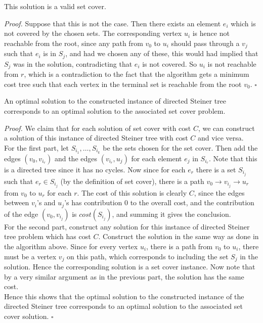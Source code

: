\documentclass[a4paper]{article}
\newenvironment{proof}{\begin{breakbox}\textit{Proof.}}{\hfill$\square$\end{breakbox}}
\newcommand{\nl}{\vspace{0.2cm}\\}
\begin{document}
\begin{claim}
    This solution is a valid set cover.
\end{claim}

\begin{proof}
    Suppose that this is not the case. Then there exists an element $e_i$ which is not covered by the chosen sets. The corresponding vertex $u_i$ is hence not reachable from the root, since any
    path from $v_0$ to $u_i$ should pass through a $v_j$ such that $e_i$ is in $S_j$, and had we chosen any of these, this would had implied that $S_j$ was in the solution, contradicting that
    $e_i$ is not covered. So $u_i$ is not reachable from $r$, which is a contradiction to the fact that the algorithm gets a minimum cost tree such that each vertex in the terminal set
    is reachable from the root $v_0$.
\end{proof}

\begin{claim}
    An optimal solution to the constructed instance of directed Steiner tree corresponds to an optimal solution to the associated set cover problem.
\end{claim}

\begin{proof}
    We claim that for each solution of set cover with cost $C$, we can construct a solution of this instance of directed Steiner tree with cost $C$ and vice versa.\nl
    For the first part, let $S_{i_1}, \ldots, S_{i_k}$ be the sets chosen for the set cover. Then add the edges $(v_0, v_{i_r})$ and the edges $(v_{i_r}, u_j)$ for each element $e_j$ in $S_{i_r}$.
    Note that this is a directed tree since it has no cycles. Now since for each $e_r$ there is a set $S_{i_j}$ such that $e_r \in S_{i_j}$ (by the definition of set cover), there is a path $v_0
    \to v_{i_j} \to u_r$ from $v_0$ to $u_r$ for each $r$. The cost of this solution is clearly $C$, since the edges between $v_i$'s and $u_j$'s has contribution $0$ to the overall cost, and the
    contribution of the edge $(v_0, v_{i_j})$ is $cost(S_{i_j})$, and summing it gives the conclusion.\nl
    For the second part, construct any solution for this instance of directed Steiner tree problem which has cost $C$. Construct the solution in the same way as done in the algorithm above. Since for
    every vertex $u_i$, there is a path from $v_0$ to $u_i$, there must be a vertex $v_j$ on this path, which corresponds to including the set $S_j$ in the solution. Hence the corresponding
    solution is a set cover instance. Now note that by a very similar argument as in the previous part, the solution has the same cost.\nl
    Hence this shows that the optimal solution to the constructed instance of the directed Steiner tree corresponds to an optimal solution to the associated set cover solution.
\end{proof}
\end{document}
